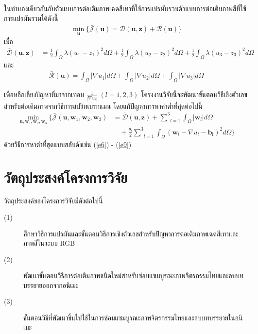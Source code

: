 \documentclass[hidelinks,a4paper]{article}
\numberwithin{equation}{section}							%
\begin{document}
{\hspace{1cm} ในทำนองเดียวกันกับตัวแบบการต่อเติมภาพเฉดสีเทาที่ใช้การแปรผันรวมตัวแบบการต่อเติมภาพสีที่ใช้การแปรผันรวมได้ดังนี้
\begin{align}
\min_{\boldsymbol{u}} \{ \bar{\mathcal{J}}(\boldsymbol{u})= \mathcal{\bar{D}}(\boldsymbol{u},\boldsymbol{z})+  \mathcal{\bar{R}}(\boldsymbol{u}) \}
\label{e10}
\end{align}
เมื่อ
\begin{align*}
\mathcal{\bar{D}}(\boldsymbol{u},\boldsymbol{z}) 
&= \frac{1}{2}\int_{\Omega}^{}\lambda(u_1 - z_1)^2 d\Omega + \frac{1}{2}\int_{\Omega}^{}\lambda(u_2 - z_2)^2 d\Omega + \frac{1}{2}\int_{\Omega}^{}\lambda(u_3 - z_3)^2 d\Omega
\end{align*}
และ 
\begin{align*}
\mathcal{\bar{R}}(\boldsymbol{u})= \int_{\Omega}^{}\lvert\nabla u_1 \rvert d\Omega + \int_{\Omega}^{}\lvert\nabla u_2 \rvert d\Omega + \int_{\Omega}^{}\lvert\nabla u_3 \rvert d\Omega
\end{align*}

\hspace{1cm} เพื่อหลีกเลี่ยงปัญหาที่มาจากเทอม $\tfrac{1}{|\nabla u_l|}\ (l=1,2,3)$ โครงงานวิจัยนี้จะพัฒนาขั้นตอนวิธีเชิงตัวเลขสำหรับต่อเติมภาพจากวิธีการสปริทเบรกแมน
โดยแก้ปัญหาการหาค่าต่ำที่สุดต่อไปนี้
\begin{align}
\min_{\boldsymbol{u},\boldsymbol{w}_1,\boldsymbol{w}_2,\boldsymbol{w}_3} \{\bar{\mathcal{J}}(\boldsymbol{u},\boldsymbol{w}_1,\boldsymbol{w}_2,\boldsymbol{w}_3)&= \mathcal{\bar{D}}(\boldsymbol{u},\boldsymbol{z}) +  \underset{l=1}{\overset{3}{\sum}} \int_{\Omega}^{}|\boldsymbol{w}_l|d\Omega
\nonumber\\
&\quad+ \frac{\theta_l}{2} \underset{l=1}{\overset{3}{\sum}}\int_{\Omega}^{}(\boldsymbol{w}_l - \nabla u_l - \boldsymbol{b_l})^{2}d\Omega\}
\end{align}
ด้วยวิธีการหาต่ำที่สุดแบบสลับดังเช่น (\ref{e6}) - (\ref{e9})

\section{วัตถุประสงค์โครงการวิจัย}
วัตถุประสงค์ของโครงการวิจัยมีดังต่อไปนี้
\begin{description}
	\item[(1)] ศึกษาวิธีการแปรผันและขั้นตอนวิธีการเชิงตัวเลขสำหรับปัญหาการต่อเติมภาพเฉดสีเทาและภาพสีในระบบ RGB
	\item[(2)] พัฒนาขั้นตอนวิธีการต่อเติมภาพชนิดใหม่สำหรับซ่อมแซมบูรณะภาพจิตรกรรมไทยและลบบทบรรยายออกจากอนิเมะ
	\item[(3)] ขั้นตอนวิธีที่พัฒนาขึ้นไปใช้ในการซ่อมแซมบูรณะภาพจิตรกรรมไทยและลบบทบรรยายในอนิเมะ
\end{description}

}
\end{document}

